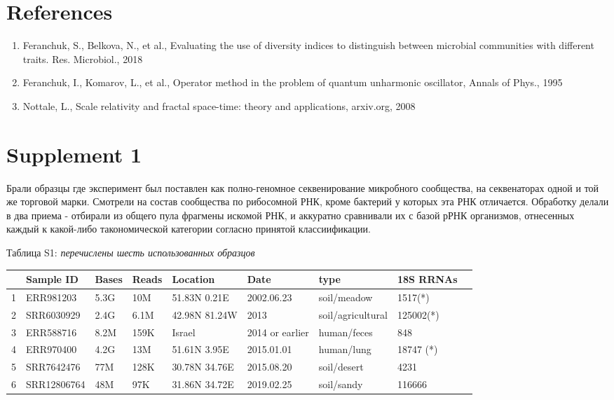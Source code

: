 \documentclass[a4paper]{article}
\begin{document}
\section{References}

\begin{enumerate}

\item Feranchuk, S., Belkova, N., et al., Evaluating the use of diversity indices to distinguish between microbial communities with different traits. Res. Microbiol., 2018

\item Feranchuk, I., Komarov, L., et al., Operator method in the problem of quantum unharmonic oscillator, Annals of Phys., 1995 

\item Nottale, L., Scale relativity and fractal space-time: theory and applications, arxiv.org, 2008

\end{enumerate}

\section{Supplement 1}

Брали образцы где эксперимент был поставлен как полно-геномное секвенирование микробного сообщества, на секвенаторах одной и той же торговой марки. Смотрели на состав сообщества по рибосомной РНК, кроме бактерий у которых эта РНК отличается. Обработку делали в два приема - отбирали из общего пула фрагмены искомой РНК, и аккуратно сравнивали их с базой рРНК организмов, отнесенных каждый к какой-либо такономической категории согласно принятой классиификации.

Таблица S1: \textit{перечислены шесть использованных образцов} 

\begin{tabular}{lllllllll}
\hline
&Sample ID&Bases&Reads&Location&Date&type&18S RRNAs\\
\hline
1&ERR981203&5.3G&10M&51.83N 0.21E&2002.06.23&soil/meadow&1517(*)\\
2&SRR6030929&2.4G&6.1M&42.98N 81.24W&2013&soil/agricultural&125002(*)\\
3&ERR588716&8.2M&159K&Israel&2014 or earlier&human/feces&848\\
4&ERR970400&4.2G&13M&51.61N 3.95E&2015.01.01&human/lung&18747 (*)\\
5&SRR7642476&77M&128K&30.78N 34.76E&2015.08.20&soil/desert&4231\\
6&SRR12806764&48M&97K&31.86N 34.72E&2019.02.25&soil/sandy&116666\\
\hline
\end{tabular}
\end{document}
